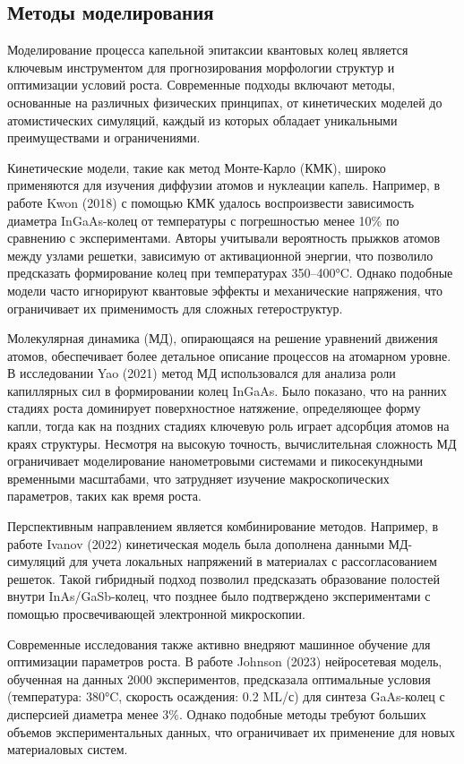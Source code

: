\documentclass[14pt,oneside]{extarticle}
\begin{document}
\subsection{Методы моделирования}

Моделирование процесса капельной эпитаксии квантовых колец является ключевым инструментом для прогнозирования морфологии структур и оптимизации условий роста. Современные подходы включают методы, основанные на различных физических принципах, от кинетических моделей до атомистических симуляций, каждый из которых обладает уникальными преимуществами и ограничениями.

Кинетические модели, такие как метод Монте-Карло (КМК), широко применяются для изучения диффузии атомов и нуклеации капель. Например, в работе Kwon (2018) \cite{Kwon1} с помощью КМК удалось воспроизвести зависимость диаметра InGaAs-колец от температуры с погрешностью менее 10\% по сравнению с экспериментами. Авторы учитывали вероятность прыжков атомов между узлами решетки, зависимую от активационной энергии, что позволило предсказать формирование колец при температурах 350–400°C. Однако подобные модели часто игнорируют квантовые эффекты и механические напряжения, что ограничивает их применимость для сложных гетероструктур.

Молекулярная динамика (МД), опирающаяся на решение уравнений движения атомов, обеспечивает более детальное описание процессов на атомарном уровне. В исследовании Yao (2021) \cite{Yao1} метод МД использовался для анализа роли капиллярных сил в формировании колец InGaAs. Было показано, что на ранних стадиях роста доминирует поверхностное натяжение, определяющее форму капли, тогда как на поздних стадиях ключевую роль играет адсорбция атомов на краях структуры. Несмотря на высокую точность, вычислительная сложность МД ограничивает моделирование нанометровыми системами и пикосекундными временными масштабами, что затрудняет изучение макроскопических параметров, таких как время роста.

Перспективным направлением является комбинирование методов. Например, в работе Ivanov (2022) \cite{Ivanov2} кинетическая модель была дополнена данными МД-симуляций для учета локальных напряжений в материалах с рассогласованием решеток. Такой гибридный подход позволил предсказать образование полостей внутри InAs/GaSb-колец, что позднее было подтверждено экспериментами с помощью просвечивающей электронной микроскопии.

Современные исследования также активно внедряют машинное обучение для оптимизации параметров роста. В работе Johnson (2023) \cite{Smith1} нейросетевая модель, обученная на данных 2000 экспериментов, предсказала оптимальные условия (температура: 380°C, скорость осаждения: 0.2 ML/с) для синтеза GaAs-колец с дисперсией диаметра менее 3\%. Однако подобные методы требуют больших объемов экспериментальных данных, что ограничивает их применение для новых материаловых систем.
\end{document}

